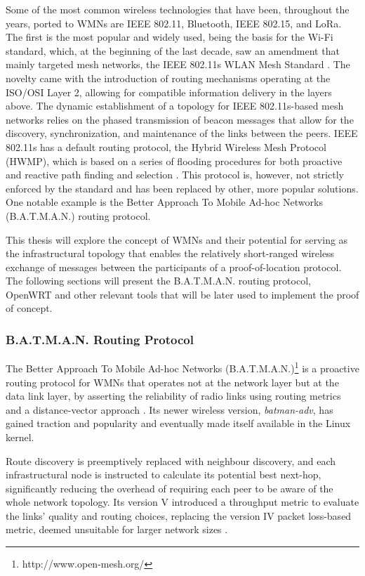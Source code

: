 Some of the most common wireless technologies that have been, throughout the years, ported to WMNs are IEEE 802.11, Bluetooth, IEEE 802.15, and LoRa. The first is the most popular and widely used, being the basis for the Wi-Fi standard, which, at the beginning of the last decade, saw an amendment that mainly targeted mesh networks, the IEEE 802.11s WLAN Mesh Standard \cite{hiertz2010ieee}. The novelty came with the introduction of routing mechanisms operating at the ISO/OSI Layer 2, allowing for compatible information delivery in the layers above. The dynamic establishment of a topology for IEEE 802.11s-based mesh networks relies on the phased transmission of beacon messages that allow for the discovery, synchronization, and maintenance of the links between the peers. IEEE 802.11s has a default routing protocol, the Hybrid Wireless Mesh Protocol (HWMP), which is based on a series of flooding procedures for both proactive and reactive path finding and selection \cite{bari2012performance}. This protocol is, however, not strictly enforced by the standard and has been replaced by other, more popular solutions. One notable example is the Better Approach To Mobile Ad-hoc Networks (B.A.T.M.A.N.) routing protocol.

This thesis will explore the concept of WMNs and their potential for serving as the infrastructural topology that enables the relatively short-ranged wireless exchange of messages between the participants of a proof-of-location protocol. The following sections will present the B.A.T.M.A.N. routing protocol, OpenWRT and other relevant tools that will be later used to implement the proof of concept.

\subsubsection{B.A.T.M.A.N. Routing Protocol}

The Better Approach To Mobile Ad-hoc Networks (B.A.T.M.A.N.)\footnote{http://www.open-mesh.org/} is a proactive routing protocol for WMNs that operates not at the network layer but at the data link layer, by asserting the reliability of radio links using routing metrics and a distance-vector approach \cite{seither2011routing}. Its newer wireless version, \emph{batman-adv}, has gained traction and popularity and eventually made itself available in the Linux kernel.

Route discovery is preemptively replaced with neighbour discovery, and each infrastructural node is instructed to calculate its potential best next-hop, significantly reducing the overhead of requiring each peer to be aware of the whole network topology. Its version V introduced a throughput metric to evaluate the links' quality and routing choices, replacing the version IV packet loss-based metric, deemed unsuitable for larger network sizes \cite{seither2011routing}.

